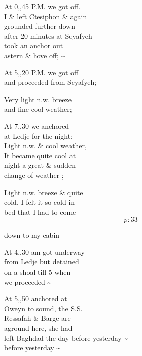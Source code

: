 \documentclass{report}
\begin{document}
	\par{
 	At 0,,45 P.M. we got off.\ \\I \& left Ctesiphon \& again\ \\grounded further down\ \\after 20 minutes at Seyafyeh\ \\took an anchor out\ \\astern \& hove off; \~{}\ \\
	}

	\par{
 	At 5,,20 P.M. we got off\ \\and proceeded from Seyafyeh;\ \\
	}

	\par{
 	Very light n.w. breeze\ \\and fine cool weather;\ \\
	}

	\par{
 	At 7,,30 we anchored\ \\at Ledje for the night;\ \\Light n.w. \& cool weather,\ \\It became quite cool at\ \\night a great \& sudden\ \\change of weather ;\ \\
	}

	\par{
 	Light n.w. breeze \& quite\ \\cold, I felt it so cold in\ \\bed that I had to come\ \\
  \[p: 33 \]

	}


	\par{
 	down to my cabin\ \\
	}

	\par{
 	At 4,,30 am got underway\ \\from Ledje but detained\ \\on a shoal till 5 when\ \\we proceeded \~{}\ \\
	}

	\par{
 	At 5,,50 anchored at\ \\Oweyn to sound, the S.S.\ \\Ressafah \& Barge are\ \\aground here, she had\ \\left Baghdad the day before yesterday \~{}\ \\before yesterday \~{}\ \\
	}
\end{document}

